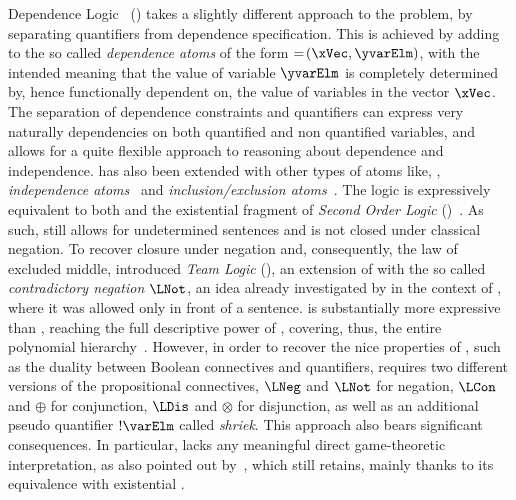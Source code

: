 \documentclass[authoryear]{elsarticle}
\begin{document}
Dependence Logic~\citep{Vaa07} (\DL) takes a slightly different approach to the
problem, by separating quantifiers from dependence specification.
This is achieved by adding to \FOL the so called \emph{dependence atoms} of the
form $=\!(\xVec, \yvarElm)$, with the intended meaning that the value of
variable $\yvarElm$ is completely determined by, hence functionally dependent
on, the value of variables in the vector $\xVec$.
The separation of dependence constraints and quantifiers can express very
naturally dependencies on both quantified and non quantified variables, and
allows for a quite flexible approach to reasoning about dependence and
independence.
\DL has also been extended with other types of atoms like, \eg,
\emph{independence atoms}~\citep{GV13a} and \emph{inclusion/exclusion
atoms}~\citep{Gal12}.
The logic is expressively equivalent to both \IF and the existential fragment of
\emph{Second Order Logic} (\SOL)~\citep{HA38,Chu56,Sha91}.
As such, \DL still allows for undetermined sentences and is not closed under
classical negation.
%
To recover closure under negation and, consequently, the law of excluded middle,
\cite{Vaa07} introduced \emph{Team Logic} (\TL), an extension of \DL with the so
called \emph{contradictory negation} $\LNot$, an idea already investigated by
\cite{Hin96} in the context of \IF, where it was allowed only in front of a
sentence.
\TL is substantially more expressive than \DL, reaching the full descriptive
power of \SOL, covering, thus, the entire polynomial hierarchy~\citep{Sto76}.
However, in order to recover the nice properties of \FOL, such as the duality
between Boolean connectives and quantifiers, \TL requires two different versions
of the propositional connectives, $\LNeg$ and $\LNot$ for negation, $\LCon$ and
$\oplus$ for conjunction, $\LDis$ and $\otimes$ for disjunction, as well as an
additional pseudo quantifier $!\varElm$ called \emph{shriek}.
This approach also bears significant consequences.
In particular, \TL lacks any meaningful direct game-theoretic interpretation, as
also pointed out by~\cite{Vaa07}, which \DL still retains, mainly thanks to its
equivalence with existential \SOL.
\end{document}
